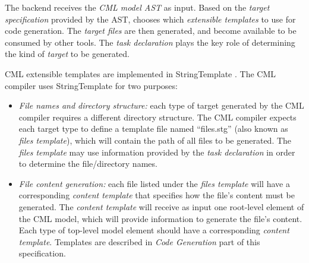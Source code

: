 The backend receives the \emph{CML model AST} as input.
Based on the \emph{target specification} provided by the AST, chooses which \emph{extensible templates} to use for code generation.
The \emph{target files} are then generated, and become available to be consumed by other tools. The \emph{task declaration} plays the key role of determining the kind of \emph{target} to be generated.

CML extensible templates are implemented in StringTemplate \cite{st}.  The CML compiler uses StringTemplate for two purposes:

\begin{itemize}
\item \emph{File names and directory structure:}
each type of target generated by the CML compiler requires a different directory structure.
The CML compiler expects each target type to define a template file named ``files.stg'' (also known as \emph{files template}),
which will contain the path of all files to be generated. The \emph{files template} may use information provided by the \emph{task declaration}
in order to determine the file/directory names.
\item \emph{File content generation:}
each file listed under the \emph{files template} will have a corresponding \emph{content template} that specifies how the file's content must be generated. The \emph{content template} will receive as input one root-level element of the CML model, which will provide information to generate the file's content.
Each type of top-level model element should have a corresponding \emph{content template}. Templates are described in \emph{Code Generation} part of this specification.
\end{itemize}
